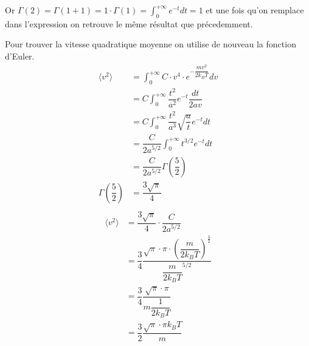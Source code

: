\documentclass[12pt,a4paper]{report}
\begin{document}
Or \(\Gamma(2) = \Gamma (1 + 1) = 1 \cdot \Gamma(1) = \int_0^{+\infty} e^{-t} dt = 1\) et une fois qu'on remplace dans l'expression on retrouve le même résultat que précedemment.

Pour trouver la vitesse quadratique moyenne on utilise de nouveau la fonction d'Euler.
\begin{align*}
	\langle v^2 \rangle &= \int_0^{+\infty} C \cdot v^4 \cdot e^{-\dfrac{mv^2}{2k_B T}} dv\\
	&= C \int_0^{+\infty} \dfrac{t^2}{a^2}e^{-t} \dfrac{dt}{2av}\\
	&= C \int_0^{+\infty} \dfrac{t^2}{a^3} \sqrt{\dfrac{a}{t}} e^{-t} dt\\
	&= \dfrac{C}{2a^{5/2}} \int_0^{+\infty} t^{3/2} e^{-t} dt\\
	&= \dfrac{C}{2a^{5/2}} \Gamma\left(\dfrac{5}{2}\right)\\
	\Gamma\left(\dfrac{5}{2}\right) &= \dfrac{3\sqrt{\pi}}{4}\\
\end{align*}
\begin{align*}
	\langle v^2 \rangle &= \dfrac{3\sqrt{\pi}}{4} \cdot \dfrac{C}{2a^{5/2}}\\
	&= \dfrac{3}{4} \dfrac{\sqrt{\pi} \cdot \pi \cdot \left( \dfrac{m}{2k_B T}\right)^\frac{3}{2}}{\dfrac{m}{2k_B T}^{5/2}}\\
	&= \dfrac{3}{4} \dfrac{\sqrt{\pi} \cdot \pi}{m\dfrac{1}{2k_B T}}\\
	&= \dfrac{3}{2} \dfrac{\sqrt{\pi} \cdot \pi k_B T}{m}\\
\end{align*}
\end{document}
